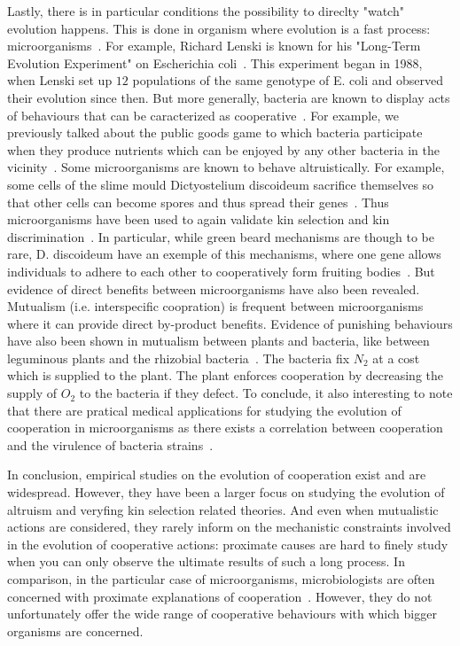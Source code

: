     Lastly, there is in particular conditions the possibility to direclty "watch" evolution happens. This is done in organism where evolution is a fast process: microorganisms~\parencite{Elena2003}. For example, Richard Lenski is known for his "Long-Term Evolution Experiment" on Escherichia coli~\parencite{Fox2015}. This experiment began in 1988, when Lenski set up $12$ populations of the same genotype of E. coli and observed their evolution since then. But more generally, bacteria are known to display acts of behaviours that can be caracterized as cooperative~\parencite{West2006}. For example, we previously talked about the public goods game to which bacteria participate when they produce nutrients which can be enjoyed by any other bacteria in the vicinity~\parencite{Harrison2013}. Some microorganisms are known to behave altruistically. For example, some cells of the slime mould Dictyostelium discoideum sacrifice themselves so that other cells can become spores and thus spread their genes~\parencite{Strassmann2000}. Thus microorganisms have been used to again validate kin selection and kin discrimination~\parencite{West2006}. In particular, while green beard mechanisms are though to be rare, D. discoideum have an exemple of this mechanisms, where one gene allows individuals to adhere to each other to cooperatively form fruiting bodies~\parencite{Queller2003}. But evidence of direct benefits between microorganisms have also been revealed. Mutualism (i.e. interspecific coopration) is frequent between microorganisms where it can provide direct by-product benefits. Evidence of punishing behaviours have also been shown in mutualism between plants and bacteria, like between leguminous plants and the rhizobial bacteria~\parencite{Kiers2003}. The bacteria fix $N_{2}$ at a cost which is supplied to the plant. The plant enforces cooperation by decreasing the supply of $O_{2}$ to the bacteria if they defect. To conclude, it also interesting to note that there are pratical medical applications for studying the evolution of cooperation in microorganisms as there exists a correlation between cooperation and the virulence of bacteria strains~\parencite{Foster2005}.


    In conclusion, empirical studies on the evolution of cooperation exist and are widespread. However, they have been a larger focus on studying the evolution of altruism and veryfing kin selection related theories. And even when mutualistic actions are considered, they rarely inform on the mechanistic constraints involved in the evolution of cooperative actions: proximate causes are hard to finely study when you can only observe the ultimate results of such a long process. In comparison, in the particular case of microorganisms, microbiologists are often concerned with proximate explanations of cooperation~\parencite{West2006}. However, they do not unfortunately offer the wide range of cooperative behaviours with which bigger organisms are concerned.

